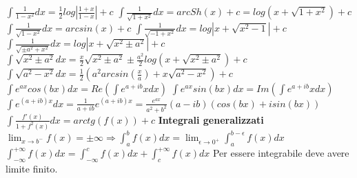 \documentclass[fontsize=8pt]{scrartcl}
\begin{document}
\begin{multicols*}{4}
$
\int \frac{1}{1-x^2} dx = \frac{1}{2}log\left|\frac{1+x}{1-x}\right|+c
$\newline
$
\int \frac{1}{\sqrt{1+x^2}} dx = arcSh(x) +c = log(x + \sqrt{1+x^2}) +c
$\newline
$
\int \frac{1}{\sqrt{1-x^2}} dx = arcsin(x) +c
$\newline
$
\int \frac{1}{\sqrt{-1 + x^2}} dx = log|x+ \sqrt{x^2-1}| +c
$\newline
$
\int \frac{1}{\sqrt{\pm a^2 + x^2}} dx = log|x + \sqrt{x^2 \pm a^2}|+c
$\newline
$
\int \sqrt{x^2 \pm a^2} dx = \frac{x}{2} \sqrt{x^2 \pm a^2} \pm \frac{a^2}{2} log(x + \sqrt{x^2 \pm a^2}) +c
$\newline
$
\int \sqrt{a^2 - x^2}dx = \frac{1}{2}(a^2arcsin(\frac{x}{a}) + x \sqrt{a^2 - x^2} )+c
$\newline
$
\int e^{ax}cos(bx) dx = Re (\int e^{a+ib}x dx ) 
$\newline
$
\int e^{ax}sin(bx) dx = Im (\int e^{a+ib}x dx ) 
$\newline
$
\int e^{(a+ib)x} dx = \frac{1}{a+ib}e^{(a+ib)x} = \frac{e^{ax}}{a^2+b^2} (a-ib)(cos(bx) + i sin(bx))
$\newline
$
\int \frac{f'(x)}{1+f^2(x)} dx = arctg(f(x))+c
$\newline
\textbf{Integrali generalizzati}\newline
$\lim_{x\rightarrow b^-} f(x) = \pm \infty \Rightarrow \int_{a}^{b}f(x) dx = \lim_{\epsilon\rightarrow 0^+} \int_{a}^{b-\epsilon} f(x) dx$\newline
$\int_{- \infty}^{+\infty} f(x) dx = \int_{-\infty}^{c} f(x) dx + \int_{c}^{+\infty} f(x) dx$\newline
Per essere integrabile deve avere limite finito.

\end{multicols*}
\end{document}
